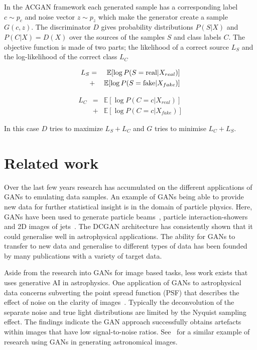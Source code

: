 \documentclass[twocolumn]{article}
\newcommand\EE{\mathbb{E}}
\numberwithin{equation}{section}
\begin{document}
In the ACGAN framework each generated sample has a corresponding label $c \sim p_c$ and noise vector $z \sim p_z$ which make the generator create a sample $G(c, z)$. The discriminator $D$ gives probability distributions $P(S|X)$ and $P(C|X) = D(X)$ over the sources of the samples $S$ and class labels $C$. The objective function is made of two parts; the likelihood of a correct source $L_S$ and the log-likelihood of the correct class $L_C$

\begin{eqnarray}
    L_S &=& \EE [\log P(S = \textup{real} | X_{real})] \nonumber \\
        &+& \EE [\log P(S = \textup{fake} | X_{fake})]
\end{eqnarray}

\begin{eqnarray}
    L_C &=& \EE [\log P(C = c | X_{real})] \nonumber \\
        &+& \EE [\log P(C = c | X_{fake})]
\end{eqnarray}

In this case $D$ tries to maximize $L_S + L_C$ and $G$ tries to minimise $L_C + L_S$.


\section{Related work}\label{sec:related_work}
Over the last few years research has accumulated on the different applications of GANs to emulating data samples. An example of GANs being able to provide new data for further statistical insight is in the domain of particle physics. Here, GANs have been used to generate particle beams~\cite{muon_beams_gan}, particle interaction-showers~\cite{particle_showers_gan} and 2D images of jets~\cite{particle_jets_gan}. The DCGAN architecture has consistently shown that it could generalise well in astrophysical applications. The ability for GANs to transfer to new data and generalise to different types of data has been founded by many publications with a variety of target data.

Aside from the research into GANs for image based tasks, less work exists that uses generative AI in astrophysics. One application of GANs to astrophysical data concerns subverting the point spread function (PSF) that describes the effect of noise on the clarity of images~\cite{gal_im_gen3}. Typically the deconvolution of the separate noise and true light distributions are limited by the Nyquist sampling effect. The findings indicate the GAN approach successfully obtains artefacts within images that have low signal-to-noise ratios. See~\cite{gal_im_gen2} for a similar example of research using GANs in generating astronomical images.
\end{document}
